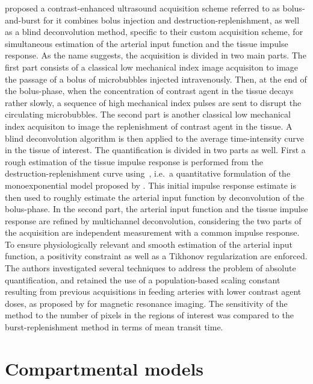 \citet{Jirik:2013cla} proposed a contrast-enhanced ultrasound acquisition scheme referred to as bolus-and-burst for it combines bolus injection and destruction-replenishment, as well as a blind deconvolution method, specific to their custom acquisition scheme, for simultaneous estimation of the arterial input function and the tissue impulse response.
As the name suggests, the acquisition is divided in two main parts.
The first part consists of a classical low mechanical index image acquisiton to image the passage of a bolus of microbubbles injected intravenously.
Then, at the end of the bolus-phase, when the concentration of contrast agent in the tissue decays rather slowly, a sequence of high mechanical index pulses are sent to disrupt the circulating microbubbles.
The second part is another classical low mechanical index acquisiton to image the replenishment of contrast agent in the tissue.
A blind deconvolution algorithm is then applied to the average time-intensity curve in the tissue of interest.
The quantification is divided in two parts as well. 
First a rough estimation of the tissue impulse response is performed from the destruction-replenishment curve using~\cite{Vogel:2005ks}, i.e.~a quantitative formulation of the monoexponential model proposed by \citet{Wei:1998jd}.
This initial impulse response estimate is then used to roughly estimate the arterial input function by deconvolution of the bolus-phase.
In the second part, the arterial input function and the tissue impulse response are refined by multichannel deconvolution, considering the two parts of the acquisition are independent measurement with a common impulse response.
To ensure physiologically relevant and smooth estimation of the arterial input function, a positivity constraint as well as a Tikhonov regularization are enforced.
The authors investigated several techniques to address the problem of absolute quantification, and retained the use of a population-based scaling constant resulting from previous acquisitions in feeding arteries with lower contrast agent doses, as proposed by \citet{Taxt:2012km} for magnetic resonance imaging.
The sensitivity of the method to the number of pixels in the regions of interest was compared to the burst-replenishment method in terms of mean transit time.


\section{Compartmental models}
\label{sec:CompartmentalModels}

